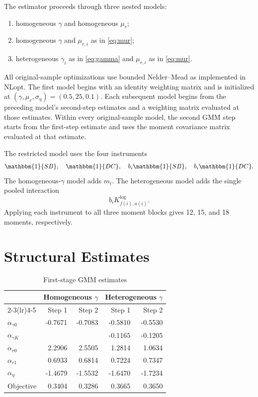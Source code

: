 \documentclass[10pt]{article}
\begin{document}
The estimator proceeds through three nested models:
\begin{enumerate}[label=(\roman*)]
\item homogeneous $\gamma$ and homogeneous $\mu_r$;
\item homogeneous $\gamma$ and $\mu_{r,i}$ as in \eqref{eq:mur};
\item heterogeneous $\gamma_i$ as in \eqref{eq:gamma} and $\mu_{r,i}$ as in
\eqref{eq:mur}.
\end{enumerate}

All original-sample optimizations use bounded Nelder--Mead as implemented in
NLopt. The first model begins with an identity weighting matrix and is
initialized at $(\gamma,\mu_r,\sigma_\eta)=(0.5,25,0.1)$. Each subsequent
model begins from the preceding model's second-step estimates and a weighting
matrix evaluated at those estimates. Within every original-sample model, the
second GMM step starts from the first-step estimate and uses the moment
covariance matrix evaluated at that estimate.

The restricted model uses the four instruments
\[
\mathbbm{1}\{SB\},\quad
\mathbbm{1}\{DC\},\quad
b_i\mathbbm{1}\{SB\},\quad
b_i\mathbbm{1}\{DC\}.
\]
The homogeneous-$\gamma$ model adds $m_i$. The heterogeneous model adds the
single pooled interaction
\[
b_i K^{\log}_{f(i),a(i)}.
\]
Applying each instrument to all three moment blocks gives 12, 15, and 18
moments, respectively.

\section{Structural Estimates}

\begin{table}[H]
\centering
\caption{First-stage GMM estimates}
\label{tab:gmm_estimates}
\begin{tabular}{lrrrr}
\toprule
& \multicolumn{2}{c}{Homogeneous $\gamma$}
& \multicolumn{2}{c}{Heterogeneous $\gamma$}\\
\cmidrule(lr){2-3}\cmidrule(lr){4-5}
& Step 1 & Step 2 & Step 1 & Step 2\\
\midrule
$\alpha_{\gamma0}$ & -0.7671 & -0.7083 & -0.5810 & -0.5530\\
$\alpha_{\gamma K}$ & & & -0.1165 & -0.1205\\
$\alpha_{r0}$ & 2.2906 & 2.5505 & 1.2814 & 1.0634\\
$\alpha_{r1}$ & 0.6933 & 0.6814 & 0.7224 & 0.7347\\
$\alpha_\eta$ & -1.4679 & -1.5532 & -1.6470 & -1.7234\\
Objective & 0.3404 & 0.3286 & 0.3665 & 0.3650\\
\bottomrule
\end{tabular}
\end{table}
\end{document}
